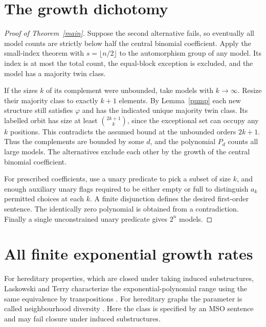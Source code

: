\documentclass[11pt]{article}
\begin{document}
\section{The growth dichotomy}
\begin{proof}[Proof of Theorem~\ref{main}]
Suppose the second alternative fails, so eventually all model counts are strictly below half the central binomial coefficient. Apply the small-index theorem with $s=\lfloor n/2\rfloor$ to the automorphism group of any model. Its index is at most the total count, the equal-block exception is excluded, and the model has a majority twin class.

If the sizes $k$ of its complement were unbounded, take models with $k\to\infty$. Resize their majority class to exactly $k+1$ elements. By Lemma~\ref{pump} each new structure still satisfies $\varphi$ and has the indicated unique majority twin class. Its labelled orbit has size at least $\binom{2k+1}{k}$, since the exceptional set can occupy any $k$ positions. This contradicts the assumed bound at the unbounded orders $2k+1$. Thus the complements are bounded by some $d$, and the polynomial $P_d$ counts all large models. The alternatives exclude each other by the growth of the central binomial coefficient.

For prescribed coefficients, use a unary predicate to pick a subset of size $k$, and enough auxiliary unary flags required to be either empty or full to distinguish $a_k$ permitted choices at each $k$. A finite disjunction defines the desired first-order sentence. The identically zero polynomial is obtained from a contradiction. Finally a single unconstrained unary predicate gives $2^n$ models.
\end{proof}

\section{All finite exponential growth rates}
For hereditary properties, which are closed under taking induced substructures, Laskowski and Terry characterize the exponential-polynomial range using the same equivalence by transpositions \cite{lt}. For hereditary graphs the parameter is called neighbourhood diversity \cite{alo}. Here the class is specified by an MSO sentence and may fail closure under induced substructures.
\end{document}
